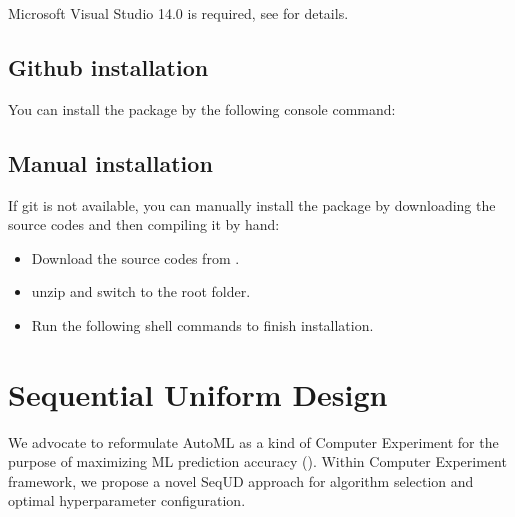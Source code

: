 \documentclass[letterpaper,10pt,english]{sphinxmanual}
\begin{document}
Microsoft Visual Studio 14.0 is required, see  for details.


\subsection{Github installation}
\label{\detokenize{installation:github-installation}}
You can install the package by the following console command:

\begin{sphinxVerbatim}[commandchars=\\\{\}]
  
\end{sphinxVerbatim}


\subsection{Manual installation}
\label{\detokenize{installation:manual-installation}}
If git is not available, you can manually install the package by downloading the source codes and then compiling it by hand:
\begin{itemize}
\item {} 
Download the source codes from .

\item {} 
unzip and switch to the root folder.

\item {} 
Run the following shell commands to finish installation.

\end{itemize}

\begin{sphinxVerbatim}[commandchars=\\\{\}]
   
  
\end{sphinxVerbatim}


\section{Sequential Uniform Design}
\label{\detokenize{pysequd:sequential-uniform-design}}\label{\detokenize{pysequd::doc}}
We advocate to reformulate AutoML as a kind of Computer Experiment for the purpose of maximizing ML prediction accuracy ().
Within Computer Experiment framework, we propose a novel SeqUD approach for algorithm selection and optimal hyperparameter configuration.
\end{document}
